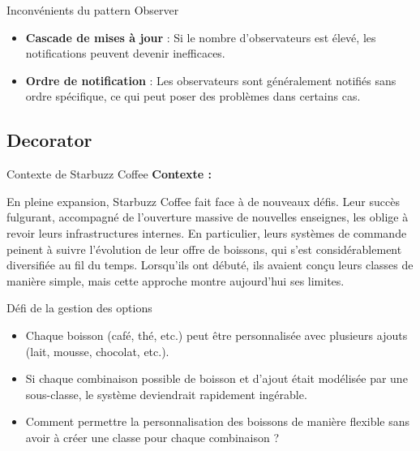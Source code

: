 \documentclass[aspectratio=169]{beamer}
\begin{document}
  \begin{frame}{Inconvénients du pattern Observer}
    \begin{itemize}
        \item \textbf{Cascade de mises à jour} : Si le nombre d'observateurs est élevé, les notifications peuvent devenir inefficaces.
        \item \textbf{Ordre de notification} : Les observateurs sont généralement notifiés sans ordre spécifique, ce qui peut poser des problèmes dans certains cas.
    \end{itemize}
  \end{frame}

  \subsection{Decorator}
  \begin{frame}{Contexte de Starbuzz Coffee}
        \textbf{Contexte :} 
        \par En pleine expansion, Starbuzz Coffee fait face à de nouveaux défis. Leur succès fulgurant, accompagné de l'ouverture massive de nouvelles enseignes, 
        les oblige à revoir leurs infrastructures internes. En particulier, leurs systèmes de commande peinent à suivre l’évolution de leur offre de boissons, 
        qui s’est considérablement diversifiée au fil du temps. Lorsqu'ils ont débuté, ils avaient conçu leurs classes de manière simple, mais cette approche montre aujourd’hui ses limites.
  \end{frame}

  \begin{frame}{Défi de la gestion des options}
    \begin{itemize}
        \item Chaque boisson (café, thé, etc.) peut être personnalisée avec plusieurs ajouts (lait, mousse, chocolat, etc.).
        \item Si chaque combinaison possible de boisson et d'ajout était modélisée par une sous-classe, le système deviendrait rapidement ingérable.
        \item Comment permettre la personnalisation des boissons de manière flexible sans avoir à créer une classe pour chaque combinaison ?
    \end{itemize}
  \end{frame}
\end{document}
